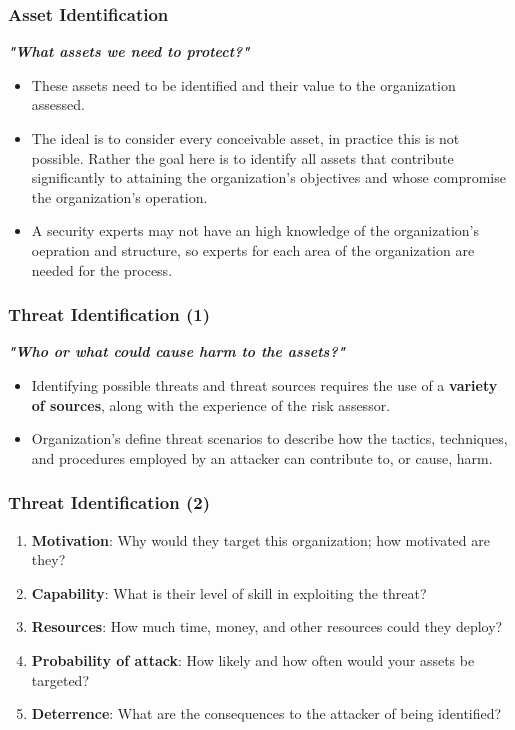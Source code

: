 \documentclass[xcolor ={table,usenames,dvipsnames}]{beamer}
\theoremstyle{definition}
\begin{document}
	\begin{frame}
		\frametitle{Asset Identification}
		\textit{\textbf{"What assets we need to protect?"}}
		\begin{itemize}
			\item These assets need to be identified and their value to the organization assessed.
			\item The ideal is to consider every conceivable asset, in practice this is not possible. Rather the goal here is to identify all assets that contribute significantly to attaining the organization’s objectives and whose compromise the organization’s operation. 
			\item A security experts may not have an high knowledge of the organization's oepration and structure, so experts for each area of the organization are needed for the process.
		\end{itemize}
	\end{frame}

	\begin{frame}
		\frametitle{Threat Identification (1)}
		\textbf{\textit{"Who or what could cause harm to the assets?"}}
		\begin{itemize}
			\item Identifying possible threats and threat sources requires the use of a \textbf{variety of sources}, along with the experience of the risk assessor. 
			\item  Organization’s define threat scenarios to describe how the tactics, techniques, and procedures employed by an attacker can contribute to, or cause, harm. 
		\end{itemize}
		
		
	\end{frame}

	\begin{frame}
		\frametitle{Threat Identification (2)}
		\begin{enumerate}
			\item  \textbf{Motivation}: Why would they target this organization; how motivated are they?
			\item \textbf{Capability}: What is their level of skill in exploiting the threat?
			\item \textbf{Resources}: How much time, money, and other resources could they deploy?
			\item \textbf{Probability of attack}: How likely and how often would your assets be targeted?
			\item \textbf{Deterrence}: What are the consequences to the attacker of being identified?	
		\end{enumerate}
	\end{frame}
	
\end{document}
